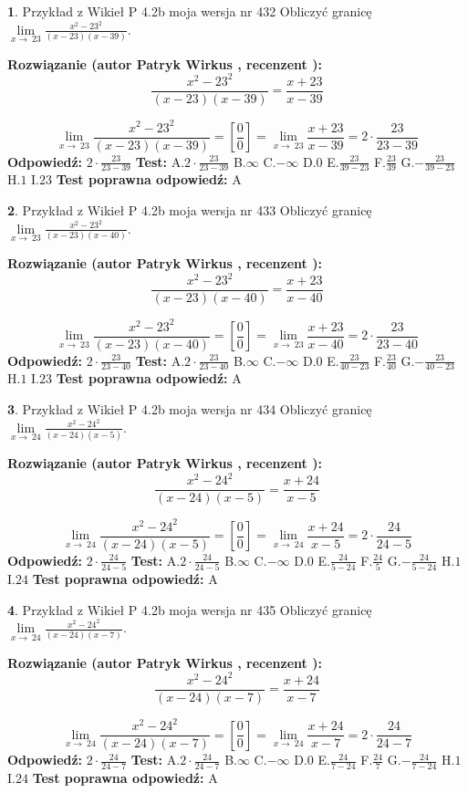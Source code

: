 \documentclass[12pt, a4paper]{article}
\theoremstyle{definition} %
\newtheorem{zad}{}
\newcommand{\zadStart}[1]{\begin{zad}#1\newline}
\newcommand{\zadStop}{\end{zad}}
\newcommand{\rozwStart}[2]{\noindent \textbf{Rozwiązanie (autor #1 , recenzent #2): }\newline}
\newcommand{\rozwStop}{\newline}
\newcommand{\odpStart}{\noindent \textbf{Odpowiedź:}\newline}
\newcommand{\odpStop}{\newline}
\newcommand{\testStart}{\noindent \textbf{Test:}\newline}
\newcommand{\testStop}{\newline}
\newcommand{\kluczStart}{\noindent \textbf{Test poprawna odpowiedź:}\newline}
\newcommand{\kluczStop}{\newline}
\begin{document}
\zadStart{Przykład z Wikieł P 4.2b moja wersja nr 432}
Obliczyć granicę $\lim\limits_{x\to\ 23}\frac{x^{2}-23^{2}}{(x-23)(x-39)}$.
\zadStop
\rozwStart{Patryk Wirkus}{}
$$\frac{x^{2}-23^{2}}{(x-23)(x-39)}=\frac{x+23}{x-39}$$

$$\lim\limits_{x\to\ 23}\frac{x^{2}-23^{2}}{(x-23)(x-39)}=[\frac{0}{0}]=\lim\limits_{x\to\ 23}\frac{x+23}{x-39}=2 \cdot \frac{23}{23-39}$$
\rozwStop
\odpStart
$2 \cdot \frac{23}{23-39}$
\odpStop
\testStart
A.$2 \cdot \frac{23}{23-39}$
B.$\infty$
C.$-\infty$
D.$0$
E.$\frac{23}{39-23}$
F.$\frac{23}{39}$
G.$-\frac{23}{39-23}$
H.$1$
I.$23$
\testStop
\kluczStart
A
\kluczStop



\zadStart{Przykład z Wikieł P 4.2b moja wersja nr 433}
Obliczyć granicę $\lim\limits_{x\to\ 23}\frac{x^{2}-23^{2}}{(x-23)(x-40)}$.
\zadStop
\rozwStart{Patryk Wirkus}{}
$$\frac{x^{2}-23^{2}}{(x-23)(x-40)}=\frac{x+23}{x-40}$$

$$\lim\limits_{x\to\ 23}\frac{x^{2}-23^{2}}{(x-23)(x-40)}=[\frac{0}{0}]=\lim\limits_{x\to\ 23}\frac{x+23}{x-40}=2 \cdot \frac{23}{23-40}$$
\rozwStop
\odpStart
$2 \cdot \frac{23}{23-40}$
\odpStop
\testStart
A.$2 \cdot \frac{23}{23-40}$
B.$\infty$
C.$-\infty$
D.$0$
E.$\frac{23}{40-23}$
F.$\frac{23}{40}$
G.$-\frac{23}{40-23}$
H.$1$
I.$23$
\testStop
\kluczStart
A
\kluczStop



\zadStart{Przykład z Wikieł P 4.2b moja wersja nr 434}
Obliczyć granicę $\lim\limits_{x\to\ 24}\frac{x^{2}-24^{2}}{(x-24)(x-5)}$.
\zadStop
\rozwStart{Patryk Wirkus}{}
$$\frac{x^{2}-24^{2}}{(x-24)(x-5)}=\frac{x+24}{x-5}$$

$$\lim\limits_{x\to\ 24}\frac{x^{2}-24^{2}}{(x-24)(x-5)}=[\frac{0}{0}]=\lim\limits_{x\to\ 24}\frac{x+24}{x-5}=2 \cdot \frac{24}{24-5}$$
\rozwStop
\odpStart
$2 \cdot \frac{24}{24-5}$
\odpStop
\testStart
A.$2 \cdot \frac{24}{24-5}$
B.$\infty$
C.$-\infty$
D.$0$
E.$\frac{24}{5-24}$
F.$\frac{24}{5}$
G.$-\frac{24}{5-24}$
H.$1$
I.$24$
\testStop
\kluczStart
A
\kluczStop



\zadStart{Przykład z Wikieł P 4.2b moja wersja nr 435}
Obliczyć granicę $\lim\limits_{x\to\ 24}\frac{x^{2}-24^{2}}{(x-24)(x-7)}$.
\zadStop
\rozwStart{Patryk Wirkus}{}
$$\frac{x^{2}-24^{2}}{(x-24)(x-7)}=\frac{x+24}{x-7}$$

$$\lim\limits_{x\to\ 24}\frac{x^{2}-24^{2}}{(x-24)(x-7)}=[\frac{0}{0}]=\lim\limits_{x\to\ 24}\frac{x+24}{x-7}=2 \cdot \frac{24}{24-7}$$
\rozwStop
\odpStart
$2 \cdot \frac{24}{24-7}$
\odpStop
\testStart
A.$2 \cdot \frac{24}{24-7}$
B.$\infty$
C.$-\infty$
D.$0$
E.$\frac{24}{7-24}$
F.$\frac{24}{7}$
G.$-\frac{24}{7-24}$
H.$1$
I.$24$
\testStop
\kluczStart
A
\kluczStop
\end{document}

